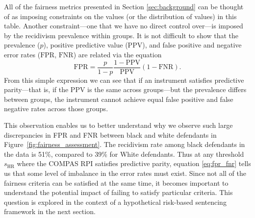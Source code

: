 \documentclass[11pt, svgnames]{article}
\newcommand{\ppv}{\mathrm{PPV}}
\newcommand{\fpr}{\mathrm{FPR}}
\newcommand{\fnr}{\mathrm{FNR}}
\numberwithin{equation}{section}
\theoremstyle{plain}
\theoremstyle{definition}
\numberwithin{prop}{section}
\numberwithin{corollary}{section}
\begin{document}
\vspace{-1em}

\noindent All of the fairness metrics presented in Section \ref{sec:background} can be thought of as imposing constraints on the values (or the distribution of values) in this table.  Another constraint---one that we have no direct control over---is imposed by the recidivism prevalence within groups.  It is not difficult to show that the prevalence ($p$), positive predictive value ($\ppv$), and false positive and negative error rates ($\fpr$, $\fnr$) are related via the equation
 \begin{equation}
   \fpr = \frac{p}{1 - p} \frac{1 - \ppv}{\ppv} ( 1 - \fnr).  
   \label{eq:fpr_fnr}
 \end{equation}
From this simple expression we can see that if an instrument satisfies predictive parity---that is, if the PPV is the same across groups---but the prevalence differs between groups, the instrument cannot achieve equal false positive and false negative rates across those groups.   
  
 This observation enables us to better understand why we observe such large discrepancies in FPR and FNR between black and white defendants in Figure~\ref{fig:fairness_assessment}. The recidivism rate among black defendants in the data is 51\%, compared to 39\% for White defendants.  Thus at any threshold $s_\mathrm{HR}$ where the COMPAS RPI satisfies predictive parity, equation \eqref{eq:fpr_fnr} tells us that some level of imbalance in the error rates must exist.  Since not all of the fairness criteria can be satisfied at the same time, it becomes important to understand the potential impact of failing to satisfy particular criteria.  This question is explored in the context of a hypothetical risk-based sentencing framework in the next section. 
 
\end{document}
